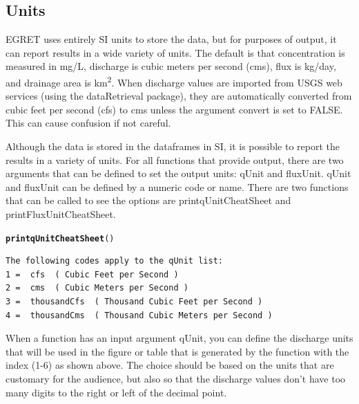\documentclass[a4paper,11pt]{article}\usepackage{graphicx, color}
\makeatletter
\newcommand{\hlfunctioncall}[1]{\textcolor[rgb]{0.501960784313725,0,0.329411764705882}{\textbf{#1}}}%
\newenvironment{kframe}{%
 \def\at@end@of@kframe{}%
 \ifinner\ifhmode%
  \def\at@end@of@kframe{\end{minipage}}%
  \begin{minipage}{\columnwidth}%
 \fi\fi%
 \def\FrameCommand##1{\hskip\@totalleftmargin \hskip-\fboxsep
 \colorbox{shadecolor}{##1}\hskip-\fboxsep
     \hskip-\linewidth \hskip-\@totalleftmargin \hskip\columnwidth}%
 \MakeFramed {\advance\hsize-\width
   \@totalleftmargin\z@ \linewidth\hsize
   \@setminipage}}%
 {\par\unskip\endMakeFramed%
 \at@end@of@kframe}
\newenvironment{knitrout}{}{} %
\makeatother
\begin{document}
\FloatBarrier
\pagebreak


\subsection{Units}
\label{sec:units}
EGRET uses entirely SI units to store the data, but for purposes of output, it can report results in a wide variety of units. The default is that concentration is measured in mg/L, discharge is cubic meters per second (cms), flux is kg/day, and drainage area is km\textsuperscript{2}. When discharge values are imported from USGS web services (using the dataRetrieval package), they are automatically converted from cubic feet per second (cfs) to cms unless the argument convert is set to FALSE.  This can cause confusion if not careful. 

Although the data is stored in the dataframes in SI, it is possible to report the results in a variety of units. For all functions that provide output, there are two arguments that can be defined to set the output units: qUnit and fluxUnit.  qUnit and fluxUnit can be defined by a numeric code or name.  There are two functions that can be called to see the options are printqUnitCheatSheet and printFluxUnitCheatSheet.


\begin{knitrout}
\color{fgcolor}\begin{kframe}
\begin{alltt}
\hlfunctioncall{printqUnitCheatSheet}()
\end{alltt}
\begin{verbatim}
The following codes apply to the qUnit list:
1 =  cfs  ( Cubic Feet per Second )
2 =  cms  ( Cubic Meters per Second )
3 =  thousandCfs  ( Thousand Cubic Feet per Second )
4 =  thousandCms  ( Thousand Cubic Meters per Second )
\end{verbatim}
\end{kframe}
\end{knitrout}


When a function has an input argument qUnit, you can define the discharge units that will be used in the figure or table that is generated by the function with the index (1-6) as shown above. The choice should be based on the units that are customary for the audience, but also so that the discharge values don't have too many digits to the right or left of the decimal point.
\end{document}
